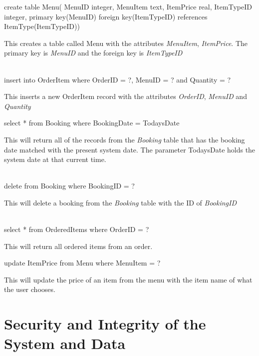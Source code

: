 \begin{sql}
   create table  Menu(
	MenuID integer,  
	MenuItem text,  
	ItemPrice real,  
	ItemTypeID integer, 
	primary key(MenuID)  
	foreign key(ItemTypeID) references ItemType(ItemTypeID))
\end{sql}
This creates a table called Menu with the attributes \textit{MenuItem}, \textit{ItemPrice}. The primary key is \textit{MenuID} and the foreign key is \textit{ItemTypeID} \\ \\

\begin{sql}
insert into OrderItem
where OrderID = ?, MenuID = ? and Quantity = ?

\end{sql}
This inserts a new OrderItem record with the attributes \textit{OrderID}, \textit{MenuID} and \textit{Quantity} \\ 

\begin{sql}
select *
from Booking
where BookingDate = TodaysDate
\end{sql}
This will return all of the records from the \textit{Booking} table that has the booking date matched with the present system date. The parameter TodaysDate holds the system date at that current time. \\ \\

\begin{sql}
delete from Booking
where BookingID = ?
\end{sql}
This will delete a booking from the \textit{Booking} table with the ID of \textit{BookingID} \\ \\

\begin{sql}
select *
from OrderedItems
where OrderID = ? 
\end{sql}
This will return all ordered items from an order.


\begin{sql}
update ItemPrice
from Menu
where MenuItem = ?
\end{sql}
This will update the price of an item from the menu with the item name of what the user chooses.

\section{Security and Integrity of the System and Data}

